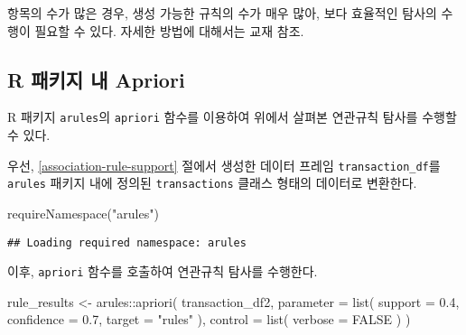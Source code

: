 \documentclass[
]{book}
\newenvironment{Shaded}{\begin{snugshade}}{\end{snugshade}}
\newcommand{\AttributeTok}[1]{\textcolor[rgb]{0.77,0.63,0.00}{#1}}
\newcommand{\ConstantTok}[1]{\textcolor[rgb]{0.00,0.00,0.00}{#1}}
\newcommand{\FloatTok}[1]{\textcolor[rgb]{0.00,0.00,0.81}{#1}}
\newcommand{\FunctionTok}[1]{\textcolor[rgb]{0.00,0.00,0.00}{#1}}
\newcommand{\NormalTok}[1]{#1}
\newcommand{\OtherTok}[1]{\textcolor[rgb]{0.56,0.35,0.01}{#1}}
\newcommand{\SpecialCharTok}[1]{\textcolor[rgb]{0.00,0.00,0.00}{#1}}
\newcommand{\StringTok}[1]{\textcolor[rgb]{0.31,0.60,0.02}{#1}}
\begin{document}
항목의 수가 많은 경우, 생성 가능한 규칙의 수가 매우 많아, 보다 효율적인 탐사의 수행이 필요할 수 있다. 자세한 방법에 대해서는 교재 \citep{jun2012datamining} 참조.

\hypertarget{apriori-r-package}{%
\subsection{R 패키지 내 Apriori}\label{apriori-r-package}}

R 패키지 \texttt{arules}의 \texttt{apriori} 함수를 이용하여 위에서 살펴본 연관규칙 탐사를 수행할 수 있다.

우선, \ref{association-rule-support} 절에서 생성한 데이터 프레임 \texttt{transaction\_df}를 \texttt{arules} 패키지 내에 정의된 \texttt{transactions} 클래스 형태의 데이터로 변환한다.

\begin{Shaded}
\begin{Highlighting}[]
\FunctionTok{requireNamespace}\NormalTok{(}\StringTok{"arules"}\NormalTok{)}
\end{Highlighting}
\end{Shaded}

\begin{verbatim}
## Loading required namespace: arules
\end{verbatim}

\begin{Shaded}
\end{Shaded}

이후, \texttt{apriori} 함수를 호출하여 연관규칙 탐사를 수행한다.

\begin{Shaded}
\begin{Highlighting}[]
\NormalTok{rule\_results }\OtherTok{\textless{}{-}}\NormalTok{ arules}\SpecialCharTok{::}\FunctionTok{apriori}\NormalTok{(}
\NormalTok{  transaction\_df2,}
  \AttributeTok{parameter =} \FunctionTok{list}\NormalTok{(}
    \AttributeTok{support =} \FloatTok{0.4}\NormalTok{,}
    \AttributeTok{confidence =} \FloatTok{0.7}\NormalTok{,}
    \AttributeTok{target =} \StringTok{"rules"}
\NormalTok{  ),}
  \AttributeTok{control =} \FunctionTok{list}\NormalTok{(}
    \AttributeTok{verbose =} \ConstantTok{FALSE}
\NormalTok{  )}
\NormalTok{)}
\end{Highlighting}
\end{Shaded}
\end{document}
